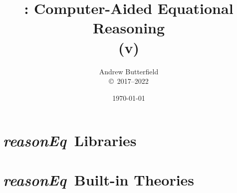 \documentclass[fleqn,10pt]{report}
\author{
Andrew Butterfield
\\
{\small \copyright\ 2017--2022}
}
\title{
  \reasonEq: Computer-Aided Equational Reasoning
  \\(v\reqVersion)
}
\date{
\today
}
\def\reasonEq{\textit{\textsf{reasonEq}}}
\begin{document}
\maketitle
\tableofcontents


\chapter{\reasonEq\ Libraries}


% 



\chapter{\reasonEq\ Built-in Theories}
%
\newpage
%
\newpage
\newpage
\newpage
\newpage
\newpage
\newpage
%
\end{document}
